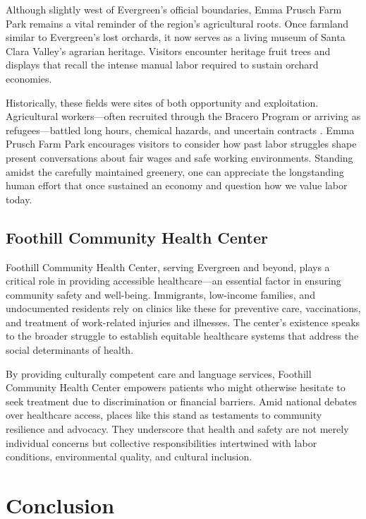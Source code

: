 \documentclass[12pt]{article}
\begin{document}
Although slightly west of Evergreen’s official boundaries, Emma Prusch Farm Park remains a vital reminder of the region’s agricultural roots. Once farmland similar to Evergreen’s lost orchards, it now serves as a living museum of Santa Clara Valley’s agrarian heritage. Visitors encounter heritage fruit trees and displays that recall the intense manual labor required to sustain orchard economies.

Historically, these fields were sites of both opportunity and exploitation. Agricultural workers—often recruited through the Bracero Program or arriving as refugees—battled long hours, chemical hazards, and uncertain contracts \cite{Cohen2011, J.2018}. Emma Prusch Farm Park encourages visitors to consider how past labor struggles shape present conversations about fair wages and safe working environments. Standing amidst the carefully maintained greenery, one can appreciate the longstanding human effort that once sustained an economy and question how we value labor today.

\subsection{Foothill Community Health Center}

Foothill Community Health Center, serving Evergreen and beyond, plays a critical role in providing accessible healthcare—an essential factor in ensuring community safety and well-being. Immigrants, low-income families, and undocumented residents rely on clinics like these for preventive care, vaccinations, and treatment of work-related injuries and illnesses. The center’s existence speaks to the broader struggle to establish equitable healthcare systems that address the social determinants of health.

By providing culturally competent care and language services, Foothill Community Health Center empowers patients who might otherwise hesitate to seek treatment due to discrimination or financial barriers. Amid national debates over healthcare access, places like this stand as testaments to community resilience and advocacy. They underscore that health and safety are not merely individual concerns but collective responsibilities intertwined with labor conditions, environmental quality, and cultural inclusion.

\section{Conclusion}
\end{document}
